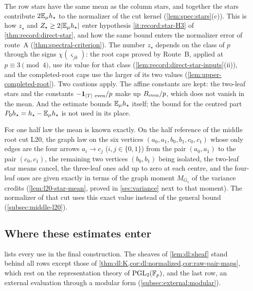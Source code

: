 \begin{remark}\label{rem:star-mean-scope}
The row stars have the same mean as the column stars, and together the stars
contribute $2\mathbb E_\mu h_\star$ to the normalizer of the cut kernel
(\cref{lem:spec:stars}(c)). This is how $z_\star$ and
$Z_\star\ge2|\mathbb E_\mu h_\star|$ enter hypothesis \ref{it:record:star-H3} of
\cref{thm:record:direct-star}, and how the same bound enters the normalizer
error of route~A (\cref{thm:spectral-criterion}). The number $z_\star$ depends
on the class of $p$ through the signs $\chi(\varsigma_{jk})$: the
root caps proved by Route~B, applied at $p\equiv3\pmod4$, use its value for that class
(\cref{lem:record:direct-star-inputs}(ii)), and the completed-root caps use the
larger of its two values (\cref{lem:upper-completed-root}). Two cautions
apply. The affine constants are kept: the two-leaf stars and the constants
$-\mathbf 1_{|T|\ \rm even}/p$ make up $B_{\rm even}/p$, which does not vanish in the
mean. And the estimate bounds $\mathbb E_\mu h_\star$ itself; the bound for the centred part $P_0h_\star=h_\star-\mathbb E_\mu h_\star$ is not used in its place.

For one half law the mean is known exactly. On the half reference of the middle
root cut L20, the graph law on the six vertices $(a_0,a_1,b_0,b_1,c_0,c_1)$ whose only edges are the four arrows $a_i\to c_j$ ($i,j\in\{0,1\}$) from the pair $(a_0,a_1)$ to the pair $(c_0,c_1)$, the remaining two vertices $(b_0,b_1)$ being isolated, the two-leaf star means
cancel, the three-leaf ones add up to zero at each centre, and the four-leaf
ones are given
exactly in terms of the graph moment $M_{G_5}$ of the variance credits
(\cref{lem:l20-star-mean}, proved in \cref{sec:variance} next to that moment).
The normalizer of that cut uses this exact value instead of the general bound
(\cref{subsec:middle-l20}).
\end{remark}

\subsection{Where these estimates enter}\label{subsec:second-order-uses}

 lists every use in the final construction. The
sheaves of \cref{lem:dl:sheaf} stand behind all rows except those of
\cref{thm:dl:K,cor:dl:normalized,cor:raw-pair-maps}, which rest on the
representation theory of $\mathrm{PGL}_2(\mathbb F_p)$, and the last row, an external
evaluation through a modular form (\cref{subsec:external:modular}).

